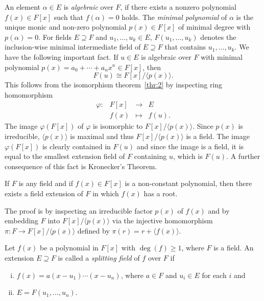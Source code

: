 An element $α∈ E$ is \emph{algebraic} over $F$, if there exists a nonzero polynomial $f(x) ∈ F[x]$  such that $f(α)= 0 $ holds. The \emph{minimal polynomial} of $α$ is the unique monic and non-zero polynomial $p(x) ∈ F[x] $ of minimal degree with $p(α)=0$. For fields $E ⊇ F$ and $u_1,\dots,u_k ∈E$, $F(u_1,\dots,u_k)$ denotes the inclusion-wise minimal intermediate field of $E⊇F$ that contains $u_1,\dots,u_k$. We have the following important fact. If $u ∈E$ is algebraic over $F$ with minimal polynomial $p(x) = a_0+ \cdots + a_n x^n ∈F[x]$, then
\begin{equation}
  \label{eq:8}
  F(u) ≅ F[x] / 〈p(x)〉.  
\end{equation}
This follows from the isomorphism theorem~\ref{thr:2} by inspecting  ring homomorphism
\begin{equation}
  \label{eq:10}
  \begin{array}{rccc}
    φ: & F[x] &→&  E \\
       &  f(x) & ↦ & f(u). 
  \end{array}
\end{equation}
The image $φ(F[x])$ of $φ$ is isomorphic to $ F[x] / 〈p(x)〉$. Since $p(x)$ is irreducible, $〈p(x)〉$ is maximal and thus $ F[x] / 〈p(x)〉$ is a field. The image $φ(F[x])$ is clearly contained in  $F(u)$ and since the image is a field, it is equal to the smallest extension field of $F$ containing $u$, which is $F(u)$. A further consequence of this fact is Kronecker's Theorem.
\begin{theorem}
  \label{thr:11}
  If $F$ is any field and if $f(x) ∈ F[x]$ is a non-constant polynomial, then there exists a field extension of $F$ in which $f(x)$ has a root. 
\end{theorem}
The proof is by inspecting an irreducible factor $p(x)$ of $f(x)$ and by embedding $F$ into $F[x] / 〈p(x)〉$ via the injective homomorphism $π: F →F[x] / 〈p(x)〉$  defined by  $π(r) = r + 〈f(x)〉$.


\begin{definition}
  \label{def:1}
  Let $f(x)$ be a polynomial in $F[x]$ with $\deg(f) ≥1$, where $F$ is a field. An extension $E ⊇F$ is called a \emph{splitting field} of $f$ over $F$ if
  \begin{enumerate}[i)]
  \item  $f(x) = a (x-u_1) \cdots (x - u_n)$, where $a ∈F$ and $u_i ∈E$ for each $i$ and
  \item $E = F(u_1,\dots,u_n)$. 
  \end{enumerate}
\end{definition}

